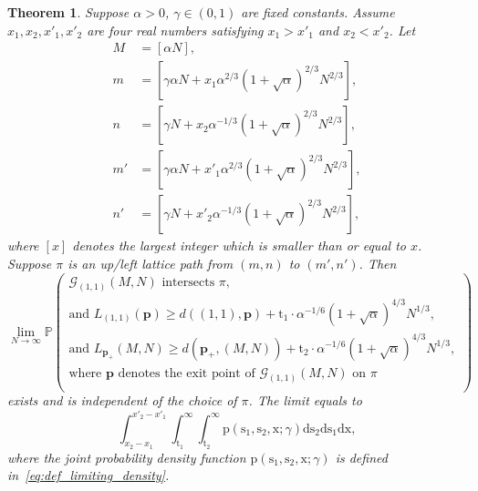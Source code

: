 \documentclass{article}
\newtheorem{thm}{Theorem}[section]
\numberwithin{equation}{section}
\newcommand{\gd}{{\mathcal{G}}}
\newcommand{\limp}{\mathrm{p}}
\newcommand{\prob}{\mathbb{P}}
\begin{document}
\begin{thm}
	\label{thm:limiting_geodesic}
	Suppose $\alpha>0$, $\gamma\in(0,1)$ are fixed constants. Assume $x_1,x_2,x'_1,x'_2$ are four real numbers satisfying $x_1>x'_1$ and $x_2<x'_2$. Let
	\begin{equation}
		\begin{split}
			M&= [\alpha N],\\
			m&=[\gamma\alpha N + x_1 \alpha^{2/3}(1+\sqrt{\alpha})^{2/3} N^{2/3}],\\
			n&=[\gamma N + x_2 \alpha^{-1/3}(1+\sqrt{\alpha})^{2/3} N^{2/3}],\\
			m'&=[\gamma\alpha N + x'_1 \alpha^{2/3}(1+\sqrt{\alpha})^{2/3} N^{2/3}],\\
			n'&=[\gamma N + x'_2 \alpha^{-1/3}(1+\sqrt{\alpha})^{2/3} N^{2/3}],
		\end{split}
	\end{equation}	
where $[x]$ denotes the largest integer which is smaller than or equal to $x$.
	 Suppose $\pi$ is an up/left lattice path from $(m,n)$ to $(m',n')$. Then
	 \begin{equation}
	 	\label{eq:prelimit_geodesic}
	 	\lim_{N\to\infty} \prob
	 	\left(
	 	\begin{array}{l}
	 		\gd_{(1,1)}{(M,N)}
	 		 \text{ intersects $\pi$,} \\
	 		\mbox{and }L_{(1,1)}(\mathbf{p})\ge d((1,1),\mathbf{p}) + \mathrm{t}_1\cdot \alpha^{-1/6}(1+\sqrt{\alpha})^{4/3} N^{1/3}, \\
	 		\mbox{and } L_{\mathbf{p}_+}(M,N)\ge d(\mathbf{p}_+,(M,N)) + \mathrm{t}_2\cdot \alpha^{-1/6}(1+\sqrt{\alpha})^{4/3} N^{1/3},\\
	 		\mbox{where $\mathbf{p}$ denotes the exit point of $\gd_{(1,1)}{(M,N)}$ on $\pi$}\\
	   \end{array}
	 	\right)
	 \end{equation}
 exists and is independent of the choice of $\pi$. %
  The limit equals to
 \begin{equation}
 	\label{eq:limit_geodesic_distribution}
 	\int_{x_2-x_1}^{x'_2-x'_1} \int_{\mathrm{t}_1}^\infty\int_{\mathrm{t}_2}^\infty
 	\limp(\mathrm{s}_1,\mathrm{s}_2,\mathrm{x};\gamma)
 	\mathrm{d}\mathrm{s}_2\mathrm{d}\mathrm{s}_1\mathrm{d}\mathrm{x},
  \end{equation}
where the joint  probability density function $\limp(\mathrm{s}_1,\mathrm{s}_2,\mathrm{x};\gamma)$ is defined in~\eqref{eq:def_limiting_density}.
\end{thm}
\end{document}
